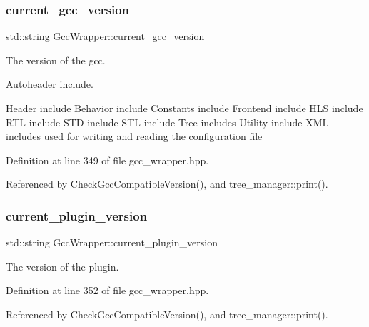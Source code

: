 \mbox{\label{classGccWrapper_afa95c1f83a36684f6aeec040aa3b281c}} 
\subsubsection{\texorpdfstring{current\+\_\+gcc\+\_\+version}{current\_gcc\_version}}
{\footnotesize\ttfamily std\+::string Gcc\+Wrapper\+::current\+\_\+gcc\+\_\+version\hspace{0.3cm}{\ttfamily [static]}}



The version of the gcc. 

Autoheader include.

Header include Behavior include Constants include Frontend include H\+LS include R\+TL include S\+TD include S\+TL include Tree includes Utility include X\+ML includes used for writing and reading the configuration file 

Definition at line 349 of file gcc\+\_\+wrapper.\+hpp.



Referenced by Check\+Gcc\+Compatible\+Version(), and tree\+\_\+manager\+::print().

\mbox{\label{classGccWrapper_a96b3eea05021578e49f12fa1502c4ddf}} 
\subsubsection{\texorpdfstring{current\+\_\+plugin\+\_\+version}{current\_plugin\_version}}
{\footnotesize\ttfamily std\+::string Gcc\+Wrapper\+::current\+\_\+plugin\+\_\+version\hspace{0.3cm}{\ttfamily [static]}}



The version of the plugin. 



Definition at line 352 of file gcc\+\_\+wrapper.\+hpp.



Referenced by Check\+Gcc\+Compatible\+Version(), and tree\+\_\+manager\+::print().

